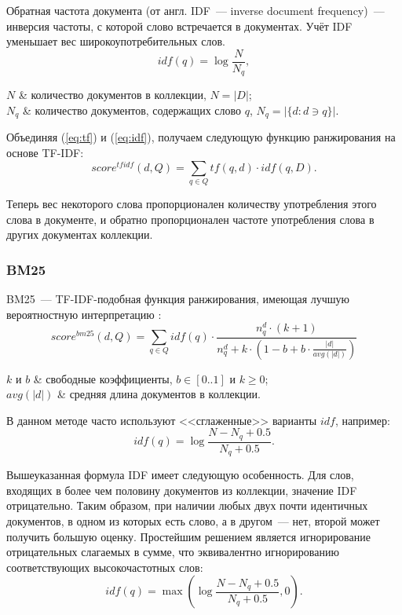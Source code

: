 Обратная частота документа (от англ. IDF~--- inverse document frequency)~--- инверсия частоты, с которой слово встречается в документах. Учёт IDF уменьшает вес широкоупотребительных слов.
\begin{equation} \label{eq:idf}
  idf(q)=\log\frac{N}{N_q},
\end{equation}
\begin{conditions}
  $N$ & количество документов в коллекции, $N=|D|$;\\
  $N_q$ & количество документов, содержащих слово $q$, $N_q=|\{d: d\ni q\}|$.
\end{conditions}

Объединяя (\ref{eq:tf}) и (\ref{eq:idf}), получаем следующую функцию ранжирования на основе TF-IDF:
\begin{equation}
  score^{tfidf}(d, Q) = \sum_{q\in Q} tf(q, d) \cdot idf(q, D).
\end{equation}

Теперь вес некоторого слова пропорционален количеству употребления этого слова в документе, и обратно пропорционален частоте употребления слова в других документах коллекции.


\subsubsection{BM25} \label{sssec:bm25}
BM25~--- TF-IDF-подобная функция ранжирования, имеющая лучшую вероятностную интерпретацию \cite{robertson09}:
\begin{equation} \label{eq:bm25}
  score^{bm25}(d, Q) = \sum_{q\in Q}idf(q)\cdot\frac{n_q^d\cdot (k+1)}{n_q^d + k\cdot\left(1-b+b\cdot\frac{|d|}{avg(|d|)}\right)}
\end{equation}
\begin{conditions}
  $k$ и $b$ & свободные коэффициенты, $b\in[0..1]$ и $k \geq 0$;\\
  $avg(|d|)$ & средняя длина документов в коллекции.
\end{conditions}

В данном методе часто используют <<сглаженные>> варианты $idf$, например:
\begin{equation}
  idf(q)=\log\frac{N - N_q + 0.5}{N_q + 0.5}.
\end{equation}

Вышеуказанная формула IDF имеет следующую особенность. Для слов, входящих в более чем половину документов из коллекции, значение IDF отрицательно. Таким образом, при наличии любых двух почти идентичных документов, в одном из которых есть слово, а в другом~--- нет, второй может получить большую оценку. Простейшим решением является игнорирование отрицательных слагаемых в сумме, что эквивалентно игнорированию соответствующих высокочастотных слов:
\begin{equation}
  idf(q)=\max\left(\log\frac{N - N_q + 0.5}{N_q + 0.5}, 0\right).
\end{equation}

